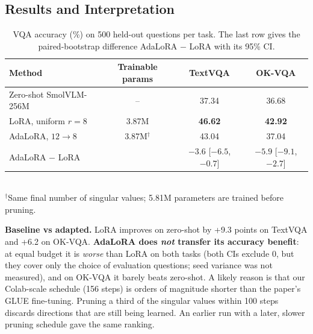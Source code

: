 \documentclass[12pt,a4paper]{article}
\newcommand{\best}[1]{\textbf{#1}}
\begin{document}
\subsection{Results and Interpretation}

\begin{table}[!htbp]
\centering\footnotesize\setlength{\abovecaptionskip}{2pt}
\caption{VQA accuracy (\%) on 500 held-out questions per task. The last row gives the paired-bootstrap difference
AdaLoRA $-$ LoRA with its 95\% CI.}
\label{tab:acc}
\begin{tabular}{@{}lccc@{}}
\toprule
\textbf{Method} & \textbf{Trainable params} & \textbf{TextVQA} & \textbf{OK-VQA} \\
\midrule
Zero-shot SmolVLM-256M    & --              & 37.34 & 36.68 \\
LoRA, uniform $r{=}8$     & 3.87M           & \best{46.62} & \best{42.92} \\
AdaLoRA, $12\rightarrow8$ & 3.87M$^\dagger$ & 43.04 & 37.04 \\
AdaLoRA $-$ LoRA          &                 & $-3.6$ [$-6.5$, $-0.7$] & $-5.9$ [$-9.1$, $-2.7$] \\
\bottomrule
\end{tabular}\\[2pt]
{\footnotesize $^\dagger$Same final number of singular values; 5.81M parameters are trained before pruning.}
\end{table}

\textbf{Baseline vs adapted.} LoRA improves on zero-shot by +9.3 points on TextVQA and +6.2 on OK-VQA.
\textbf{AdaLoRA does \emph{not} transfer its accuracy benefit}: at equal budget it is \emph{worse}
than LoRA on both tasks (both CIs exclude 0, but they cover only the choice of evaluation questions; seed
variance was not measured), and on OK-VQA it barely beats zero-shot. A likely reason is that our
Colab-scale schedule (156 steps) is orders of magnitude shorter than the paper's GLUE fine-tuning. Pruning a third of the singular values within 100
steps discards directions that are still being learned. An earlier run with a later, slower pruning schedule gave
the same ranking.
\end{document}
